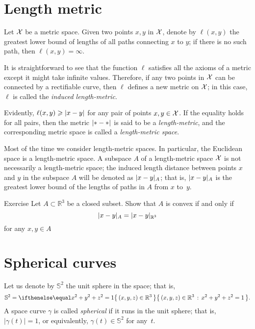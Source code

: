 \section{Length metric}\label{sec:Length metric}

Let $\mathcal{X}$ be a metric space.
Given two points $x,y$ in $\mathcal{X}$, denote by $\ell(x,y)$ the greatest lower bound of lengths of all paths connecting $x$ to $y$; if there is no such path, then $\ell(x,y)=\infty$.

It is straightforward to see that the function $\ell$ satisfies all the axioms of a metric except it might take infinite values.
Therefore, if any two points in $\mathcal{X}$ can be connected by a rectifiable curve, then $\ell$ defines a new metric on $\mathcal{X}$;
in this case, $\ell$ is called the \emph{induced length-metric}.

Evidently, $\ell(x,y)\ge \dist{x}{y}{}$ for any pair of points $x,y\in \mathcal{X}$.
If the equality holds for all pairs, then the metric $\dist{{*}}{{*}}{}$ is said to be a \emph{length-metric}, and the corresponding metric space is called a \index{}\emph{length-metric space}.

Most of the time we consider length-metric spaces.
In particular, the Euclidean space is a length-metric space.
A subspace $A$ of a length-metric space $\mathcal{X}$ is not necessarily a length-metric space;
the induced length distance between points $x$ and $y$ in the subspace $A$ will be denoted as $\dist{x}{y}A$;
that is, $\dist{x}{y}A$ is the greatest lower bound of the lengths of paths in $A$ from $x$ to~$y$.

\begin{thm}{Exercise}\label{ex:intrinsic-convex}
Let $A\subset \mathbb{R}^3$ be a closed subset.
Show that $A$ is convex if and only if
\[\dist{x}{y}A=\dist{x}{y}{\mathbb{R}^3}\]
for any $x,y\in A$
\end{thm}


\section{Spherical curves}

Let us denote by $\mathbb{S}^2$ the unit sphere in the space; that is,
\[\mathbb{S}^2=\set{(x,y,z)\in\mathbb{R}^3}{x^2+y^2+z^2=1}.\]
A space curve $\gamma$ is called \emph{spherical} if it runs in the unit sphere;
that is, $|\gamma(t)|=1$, or equivalently, $\gamma(t)\in\mathbb{S}^2$  for any~$t$.

